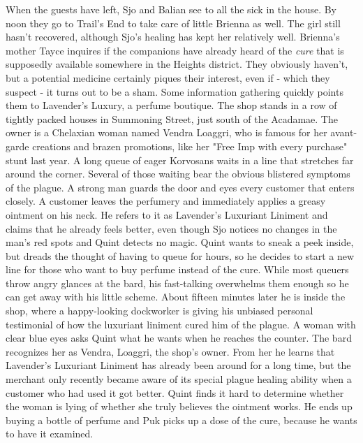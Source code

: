 When the guests have left, Sjo and Balian see to all the sick in the house. By noon they go to Trail's End to take care of little Brienna as well. The girl still hasn't recovered, although Sjo's healing has kept her relatively well. Brienna's mother Tayce inquires if the companions have already heard of the {\itshape cure} that is supposedly available somewhere in the Heights district. They obviously haven't, but a potential medicine certainly piques their interest, even if - which they suspect - it turns out to be a sham. Some information gathering quickly points them to Lavender's Luxury, a perfume boutique. The shop stands in a row of tightly packed houses in Summoning Street, just south of the Acadamae. The owner is a Chelaxian woman named Vendra Loaggri, who is famous for her avant-garde creations and brazen promotions, like her "Free Imp with every purchase" stunt last year. A long queue of eager Korvosans waits in a line that stretches far around the corner. Several of those waiting bear the obvious blistered symptoms of the plague. A strong man guards the door and eyes every customer that enters closely. A customer leaves the perfumery and immediately applies a greasy ointment on his neck. He refers to it as Lavender's Luxuriant Liniment and claims that he already feels better, even though Sjo notices no changes in the man's red spots and Quint detects no magic. Quint wants to sneak a peek inside, but dreads the thought of having to queue for hours, so he decides to start a new line for those who want to buy perfume instead of the cure. While most queuers throw angry glances at the bard, his fast-talking overwhelms them enough so he can get away with his little scheme. About fifteen minutes later he is inside the shop, where a happy-looking dockworker is giving his unbiased personal testimonial of how the luxuriant liniment cured him of the plague. A woman with clear blue eyes asks Quint what he wants when he reaches the counter. The bard recognizes her as Vendra, Loaggri, the shop's owner. From her he learns that Lavender's Luxuriant Liniment has already been around for a long time, but the merchant only recently became aware of its special plague healing ability when a customer who had used it got better. Quint finds it hard to determine whether the woman is lying of whether she truly believes the ointment works. He ends up buying a bottle of perfume and Puk picks up a dose of the cure, because he wants to have it examined.\\

